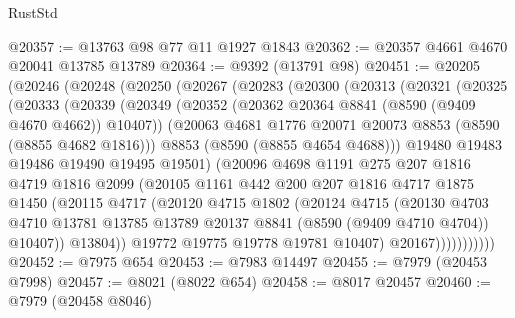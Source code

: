 \begin{lexlean}{RustStd}
\begin{coremodule}
@20357 := @13763 @98 @77 @11 @1927 @1843
@20362 := @20357 @4661 @4670 @20041 @13785 @13789
@20364 := @9392 (@13791 @98)
@20451 := @20205
    (@20246
      (@20248
        (@20250
          (@20267
            (@20283
              (@20300
                (@20313
                  (@20321
                    (@20325
                      (@20333
                        (@20339
                          (@20349
                            (@20352 (@20362 @20364 @8841 (@8590 (@9409 @4670 @4662)) @10407))
                            (@20063 @4681 @1776 @20071 @20073 @8853 (@8590 (@8855 @4682 @1816)))
                            @8853
                            (@8590 (@8855 @4654 @4688)))
                          @19480
                          @19483
                          @19486
                          @19490
                          @19495
                          @19501)
                        (@20096
                          @4698
                          @1191
                          @275
                          @207
                          @1816
                          @4719
                          @1816
                          @2099
                          (@20105
                            @1161
                            @442
                            @200
                            @207
                            @1816
                            @4717
                            @1875
                            @1450
                            (@20115
                              @4717
                              (@20120
                                @4715
                                @1802
                                (@20124
                                  @4715
                                  (@20130
                                    @4703
                                    @4710
                                    @13781
                                    @13785
                                    @13789
                                    @20137
                                    @8841
                                    (@8590 (@9409 @4710 @4704))
                                    @10407))
                                @13804))
                            @19772
                            @19775
                            @19778
                            @19781
                            @10407)
                          @20167)))))))))))
@20452 := @7975 @654
@20453 := @7983 @14497
@20455 := @7979 (@20453 @7998)
@20457 := @8021 (@8022 @654)
@20458 := @8017 @20457
@20460 := @7979 (@20458 @8046)

\end{coremodule}
\end{lexlean}
